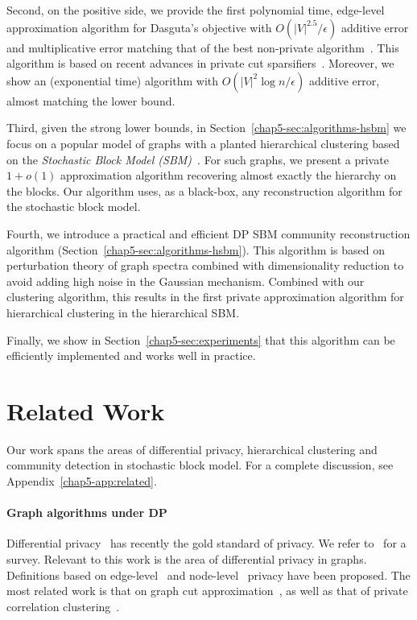 Second, on the positive side, we provide the first polynomial time, edge-level approximation algorithm for Dasguta's objective with $ O(|V|^{2.5} /\epsilon)$ additive error and multiplicative error matching that of the best non-private algorithm~\citep{agarwal2022sublinear}. This algorithm is based on recent advances in private cut sparsifiers~\citep{eliavs2020differentially}. Moreover, we show an (exponential time) algorithm with $O(|V|^{2} \log n/ \epsilon)$ additive error, almost matching the lower bound.

Third, given the strong lower bounds, in Section~\ref{chap5-sec:algorithms-hsbm} we focus on a popular model of graphs with a planted hierarchical clustering based on the {\em Stochastic Block Model (SBM)}~\citep{cohen2017hierarchical}. For such graphs, we present a private $1+o(1)$ approximation algorithm recovering almost exactly the hierarchy on the blocks. Our algorithm uses, as a black-box, any reconstruction algorithm for the stochastic block model. 

Fourth, we introduce a practical and efficient DP SBM community reconstruction algorithm (Section~\ref{chap5-sec:algorithms-hsbm}). This algorithm is based on perturbation theory of graph spectra combined with dimensionality reduction to avoid adding high noise in the Gaussian mechanism. Combined with our clustering algorithm, this results in the first private approximation algorithm for hierarchical clustering in the hierarchical SBM. 

Finally, we show in Section~\ref{chap5-sec:experiments} that this algorithm can be efficiently implemented and works well in practice.

\section{Related Work}
\label{chap5-sec:related}

Our work spans the areas of differential privacy, hierarchical clustering and community detection in stochastic block model. For a complete discussion, see Appendix~\ref{chap5-app:related}.

\paragraph{Graph algorithms under DP}
Differential privacy~\citep{dwork2006calibrating} has recently the gold standard of privacy. We refer to~\citet{dwork2014algorithmic} for a survey. Relevant to this work is the area of differential privacy in graphs. Definitions based on edge-level~\citep{epasto2022differentially,eliavs2020differentially} and node-level~\citep{kasiviswanathan2013analyzing} privacy have been proposed. The most related work is that on graph cut approximation~\citep{eliavs2020differentially,arora2019differentially}, as well as that of private correlation clustering~\citep{bun2021differentially, cohen2022near}.

